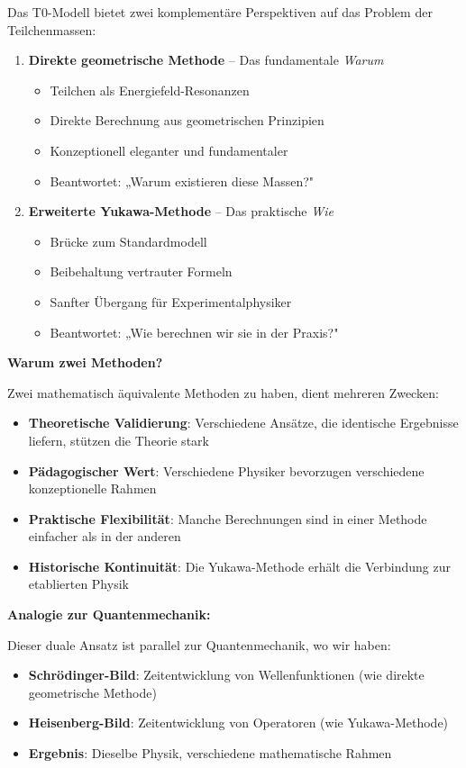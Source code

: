 \documentclass[12pt,a4paper]{article}
\begin{document}
	Das T0-Modell bietet zwei komplementäre Perspektiven auf das Problem der Teilchenmassen:
	
	\begin{enumerate}
		\item \textbf{Direkte geometrische Methode} -- Das fundamentale \textit{Warum}
		\begin{itemize}
			\item Teilchen als Energiefeld-Resonanzen
			\item Direkte Berechnung aus geometrischen Prinzipien
			\item Konzeptionell eleganter und fundamentaler
			\item Beantwortet: „Warum existieren diese Massen?"
		\end{itemize}
		
		\item \textbf{Erweiterte Yukawa-Methode} -- Das praktische \textit{Wie}
		\begin{itemize}
			\item Brücke zum Standardmodell
			\item Beibehaltung vertrauter Formeln
			\item Sanfter Übergang für Experimentalphysiker
			\item Beantwortet: „Wie berechnen wir sie in der Praxis?"
		\end{itemize}
	\end{enumerate}
	
	\textbf{Warum zwei Methoden?}
	
	Zwei mathematisch äquivalente Methoden zu haben, dient mehreren Zwecken:
	
	\begin{itemize}
		\item \textbf{Theoretische Validierung}: Verschiedene Ansätze, die identische Ergebnisse liefern, stützen die Theorie stark
		\item \textbf{Pädagogischer Wert}: Verschiedene Physiker bevorzugen verschiedene konzeptionelle Rahmen
		\item \textbf{Praktische Flexibilität}: Manche Berechnungen sind in einer Methode einfacher als in der anderen
		\item \textbf{Historische Kontinuität}: Die Yukawa-Methode erhält die Verbindung zur etablierten Physik
	\end{itemize}
	
	\textbf{Analogie zur Quantenmechanik:}
	
	Dieser duale Ansatz ist parallel zur Quantenmechanik, wo wir haben:
	\begin{itemize}
		\item \textbf{Schrödinger-Bild}: Zeitentwicklung von Wellenfunktionen (wie direkte geometrische Methode)
		\item \textbf{Heisenberg-Bild}: Zeitentwicklung von Operatoren (wie Yukawa-Methode)
		\item \textbf{Ergebnis}: Dieselbe Physik, verschiedene mathematische Rahmen
	\end{itemize}
	
\end{document}
